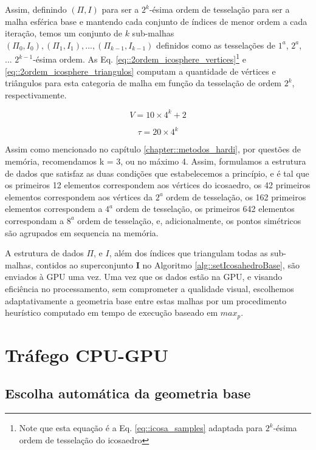 Assim, definindo $(\Pi, I)$ para ser a $2^{k}$-ésima ordem de tesselação para ser a malha esférica base e mantendo cada conjunto de índices de menor ordem a cada iteração, temos um conjunto de $k$ sub-malhas $(\Pi_0, I_0), (\Pi_1, I_1), ..., (\Pi_{k-1}, I_{k-1})$ definidos como as tesselações de $1^{a}$, $2^{a}$, ... $2^{k-1}$-ésima ordem. As Eq. \ref{eq::2ordem_icosphere_vertices}\footnote{Note que esta equação é a Eq. \ref{eq::icosa_samples} adaptada para $2^k$-ésima ordem de tesselação do icosaedro} e \ref{eq::2ordem_icosphere_triangulos} computam a quantidade de vértices e triângulos para esta categoria de malha em função da tesselação de ordem $2^k$, respectivamente.

\begin{equation}
\label{eq::2ordem_icosphere_vertices}
V = 10\times 4^k + 2
\end{equation}

\begin{equation}
\label{eq::2ordem_icosphere_triangulos}
\tau = 20\times 4^k
\end{equation}

Assim como mencionado no capítulo \ref{chapter::metodos_hardi}, por questões de memória, recomendamos k = 3, ou no máximo 4. Assim, formulamos a estrutura de dados que satisfaz as duas condições que estabelecemos a princípio, e é tal que os primeiros 12 elementos correspondem aos vértices do icosaedro, os 42 primeiros elementos correspondem aos vértices da $2^a$ ordem de tesselação, os 162 primeiros elementos correspondem a $4^a$ ordem de tesselação, os primeiros 642 elementos correspondam a $8^{a}$ ordem de tesselação, e, adicionalmente, os pontos simétricos são agrupados em sequencia na memória.

A estrutura de dados $\Pi$, e $I$, além dos índices que triangulam todas as sub-malhas, contidos ao superconjunto $\mathbf{I}$ no Algoritmo \ref{alg::setIcosahedroBase}, são enviados à GPU uma vez. Uma vez que os dados estão na GPU, e visando eficiência no processamento, sem comprometer a qualidade visual, escolhemos adaptativamente a geometria base entre estas malhas por um procedimento heurístico computado em tempo de execução baseado em $max_p$.

\section{Tráfego CPU-GPU}

\subsection{Escolha automática da geometria base}
\label{sssec::escolha_automatica_da_geometria_base}

